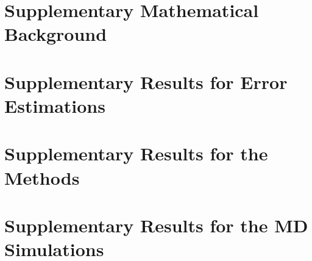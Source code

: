 \documentclass[a4paper]{ustthesis}
\begin{document}
\appendix

\chapter{Supplementary Mathematical Background}
\label{chp_math}


% 

\chapter{Supplementary Results for Error Estimations}
\label{chp_appendix_icm}


\chapter{Supplementary Results for the Methods}
\label{chp_appendix_soe}


\chapter{Supplementary Results for the MD Simulations}
\label{chp_appendix_quasiewald}


\end{document}
